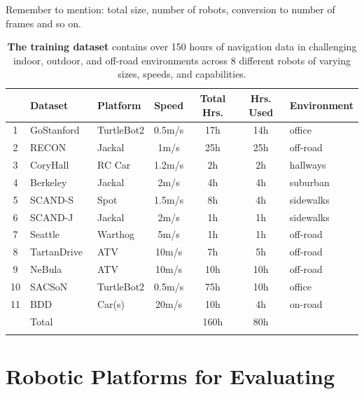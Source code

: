 Remember to mention: total size, number of robots, conversion to number of frames and so on.

\begin{table}
    \centering
    {\footnotesize
    \begin{tabular}{cllcccl}
    \toprule
    & Dataset & Platform & Speed & Total Hrs. & Hrs. Used & Environment \\ \midrule
    1 & GoStanford~\cite{hirose2019deep} & TurtleBot2 & 0.5m/s & 17h & 14h & office \\
    2 & RECON~\cite{shah2021rapid}  & Jackal & 1m/s & 25h & 25h & off-road \\
    3 & CoryHall~\cite{kahn2018gcg} & RC Car & 1.2m/s & 2h & 2h & hallways \\
    4 & Berkeley~\cite{shah2022viking}  & Jackal & 2m/s & 4h & 4h & suburban \\
    5 & SCAND-S~\cite{karnan2022scand} & Spot & 1.5m/s & 8h & 4h & sidewalks \\
    6 & SCAND-J~\cite{karnan2022scand} & Jackal & 2m/s & 1h & 1h & sidewalks \\
    7 & Seattle~\cite{shaban2021semantic} & Warthog & 5m/s & 1h & 1h & off-road \\
    8 & TartanDrive~\cite{triest2022tartan} & ATV & 10m/s & 7h & 5h & off-road \\
    9 & NeBula~\cite{agha2021nebula} & ATV & 10m/s & 10h & 10h & off-road \\
    10 & SACSoN~\cite{hirose2023sacson} & TurtleBot2 & 0.5m/s & 75h & 10h & office \\
    11 & BDD~\cite{Yu2020bdd100k} & Car(s) & 20m/s & 10h & 4h & on-road \\
    \midrule
    & Total & & & 160h & 80h & \\
    \bottomrule \\
    \end{tabular}}
    \caption{\textbf{The \ModelName training dataset} contains over 150 hours of navigation data in challenging indoor, outdoor, and off-road environments across 8 different robots of varying sizes, speeds, and capabilities.}
    \label{tab:dataset}
    \vspace*{-1.8em}
\end{table}


\section{Robotic Platforms for Evaluating \ModelName}
\label{sec:app:robots}

